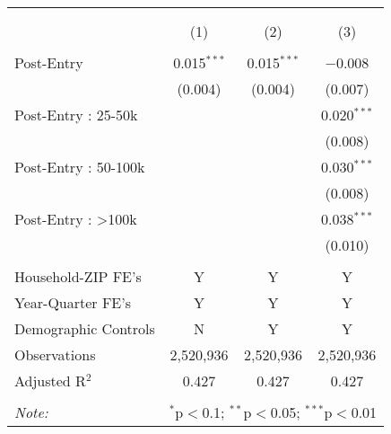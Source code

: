 
\begin{table}[!htbp] \centering 
  \caption{} 
  \label{} 
\begin{tabular}{@{\extracolsep{5pt}}lccc} 
\\[-1.8ex]\hline 
\hline \\[-1.8ex] 
\\[-1.8ex] & (1) & (2) & (3)\\ 
\hline \\[-1.8ex] 
 Post-Entry & 0.015$^{***}$ & 0.015$^{***}$ & $-$0.008 \\ 
  & (0.004) & (0.004) & (0.007) \\ 
  Post-Entry : 25-50k &  &  & 0.020$^{***}$ \\ 
  &  &  & (0.008) \\ 
  Post-Entry : 50-100k &  &  & 0.030$^{***}$ \\ 
  &  &  & (0.008) \\ 
  Post-Entry : >100k &  &  & 0.038$^{***}$ \\ 
  &  &  & (0.010) \\ 
 \hline \\[-1.8ex] 
Household-ZIP FE's & Y & Y & Y \\ 
Year-Quarter FE's & Y & Y & Y \\ 
Demographic Controls & N & Y & Y \\ 
Observations & 2,520,936 & 2,520,936 & 2,520,936 \\ 
Adjusted R$^{2}$ & 0.427 & 0.427 & 0.427 \\ 
\hline 
\hline \\[-1.8ex] 
\textit{Note:}  & \multicolumn{3}{l}{$^{*}$p$<$0.1; $^{**}$p$<$0.05; $^{***}$p$<$0.01} \\ 
\end{tabular} 
\end{table} 

